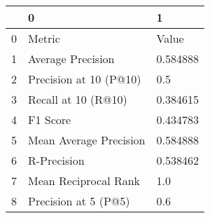 \begin{tabular}{lll}
\toprule
{} &                       0 &         1 \\
\midrule
0 &                  Metric &     Value \\
1 &       Average Precision &  0.584888 \\
2 &  Precision at 10 (P@10) &       0.5 \\
3 &     Recall at 10 (R@10) &  0.384615 \\
4 &                F1 Score &  0.434783 \\
5 &  Mean Average Precision &  0.584888 \\
6 &             R-Precision &  0.538462 \\
7 &    Mean Reciprocal Rank &       1.0 \\
8 &    Precision at 5 (P@5) &       0.6 \\
\bottomrule
\end{tabular}
